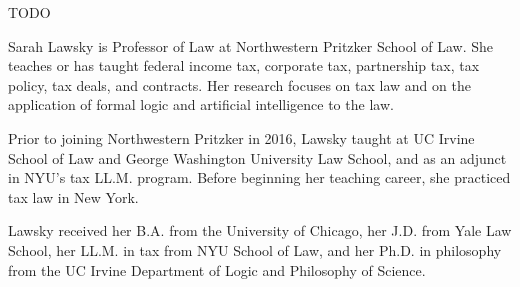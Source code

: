 \medskip



\talkabstract
TODO

\bio
Sarah Lawsky is Professor of Law at Northwestern Pritzker School of Law. She
teaches or has taught federal income tax, corporate tax, partnership tax, tax
policy, tax deals, and contracts. Her research focuses on tax law and on the
application of formal logic and artificial intelligence to the law.

Prior to joining Northwestern Pritzker in 2016, Lawsky taught at UC Irvine
School of Law and George Washington University Law School, and as an adjunct in
NYU’s tax LL.M. program. Before beginning her teaching career, she practiced tax
law in New York.

Lawsky received her B.A. from the University of Chicago, her J.D. from Yale Law
School, her LL.M. in tax from NYU School of Law, and her Ph.D. in philosophy
from the UC Irvine Department of Logic and Philosophy of Science.

\newpage
